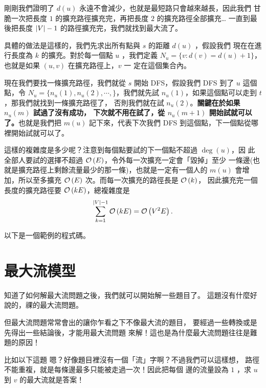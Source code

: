 \documentclass[a4paper,12pt]{book}
\begin{document}
剛剛我們證明了 $d(u)$ 永遠不會減少，也就是最短路只會越來越長，因此我們
甘脆一次把長度 $1$ 的擴充路徑擴充完，再把長度 $2$ 的擴充路徑全部擴充…
一直到最後把長度 $\lvert V \rvert - 1$ 的路徑擴充完，我們就找到最大流了。

具體的做法是這樣的，我們先求出所有點與 $s$ 的距離 $d(u)$ ，假設我們
現在在進行長度為 $k$ 的擴充。對於每一個點 $u$ ，我們定義 $N_u = 
\{ v: d(v) = d(u) + 1 \}$，也就是如果 $(u, v)$ 在擴充路徑上，$v$ 一
定在這個集合內。 

現在我們要找一條擴充路徑，我們就從 $s$ 開始 DFS，假設我們 DFS 到了
$u$ 這個點，令 $N_u = \{ n_u(1), n_u(2), \cdots, \}$，我們就先試
$n_u(1)$，如果這個點可以走到 $t$，那我們就找到一條擴充路徑了，
否則我們就在試 $n_u(2)$。{\bf 關鍵在於如果 $n_u(m)$ 試過了沒有成功，
下次就不用在試了，從 $n_u(m+1)$ 開始試就可以了。}也就是我們把 $m(u)$
記下來，代表下次我們 DFS 到這個點，下一個點從哪裡開始試就可以了。

這樣的複雜度是多少呢？注意到每個點要試的下一個點不超過 $\deg(u)$，因
此全部人要試的選擇不超過 $\operatorname{\mathcal{O}}\left(E\right)$，令外每一次擴充一定會「毀掉」至少
一條邊(也就是擴充路徑上剩餘流量最少的那一條)，也就是一定有一個人的
$m(u)$ 會增加，所以至多擴充 $\operatorname{\mathcal{O}}\left(E\right)$ 次。而每一次擴充的路徑長是 $\operatorname{\mathcal{O}}\left(k\right)$，
因此擴充完一個長度的擴充路徑要 $\operatorname{\mathcal{O}}\left(kE\right)$，總複雜度是
\[ \sum_{k = 1}^{\lvert V \rvert-1} \operatorname{\mathcal{O}}\left(kE\right) = \operatorname{\mathcal{O}}\left(V^2 E\right). \] 

以下是一個範例的程式碼。


\section{最大流模型}
知道了如何解最大流問題之後，我們就可以開始解一些題目了。
這題沒有什麼好說的，祼的最大流問題。 

但最大流問題常常會出的讓你乍看之下不像最大流的題目，
要經過一些轉換或是先得出一些結論後，才能用最大流問題
來解！這也是為什麼最大流問題往往是難題的原因！

比如以下這題
嗯？好像題目裡沒有一個「流」字啊？不過我們可以這樣想，
路徑不能重複，就是每條邊最多只能被走過一次！因此把每個
邊的流量設為 $1$ ，求 $u$ 到 $v$ 的最大流就是答案！
\end{document}

